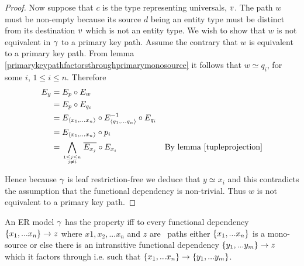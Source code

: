 \begin{proof}
Now suppose that $c$ is the type representing universals, $v$. The path $w$ must be non-empty because its source $d$ being an entity type must be distinct from its destination $v$ which is not an entity type. 
We wish to show that $w$ is not equivalent in $\gamma$ to
a primary key path. Assume the contrary that $w$ is equivalent to a primary key path. From lemma 
\ref{primarykeypathfactorsthroughprimarymonosource} it follows that $w \simeq q_i$, for some
$i$, $1 \leq i \leq n$.  
Therefore
\begin{align*}
E_y &= E_p \circ E_w                                        && \text{}\\
		&= E_p \circ E_{q_i}                                      && \text{}\\
		&= E_{\xntuple} \circ E_{\qntuple}^{-1} \circ E_{q_i}     && \text{}\\
		&= E_{\xntuple} \circ p_i                                 && \text{} \\
		&= \bigwedge\limits_{\genfrac{}{}{0pt}{}{1 \leq j \leq n}{ j \neq i}}{\overline{E_{x_j}}}\circ E_{x_i}  
		                                                        && \text{By lemma \ref{tupleprojection}}
\end{align*} 

Hence because $\gamma$ is leaf  restriction-free we deduce that $y \simeq x_i$ 
 and this contradicts the assumption that the functional dependency
is non-trivial. Thus $w$ is not equivalent to a primary key path.
\end{proof}

\begin{definition}
\noindent An ER model $\gamma$ has the \term{\fdfactoring} property iff to every functional dependency $\left\{x_1,...x_n\right\} \rightarrow z$ where $x1, x_2, ... x_n$ and $z$ are \attributelike\ paths either $\left\{x_1,...x_n\right\}$ is
a mono-source or else there is an intransitive functional dependency $\left\{y_1,...y_m\right\} \rightarrow z$ which it factors through i.e. such that $\left\{x_1,...x_n\right\} \rightarrow \left\{y_1,...y_m\right\}$.
\end{definition}

